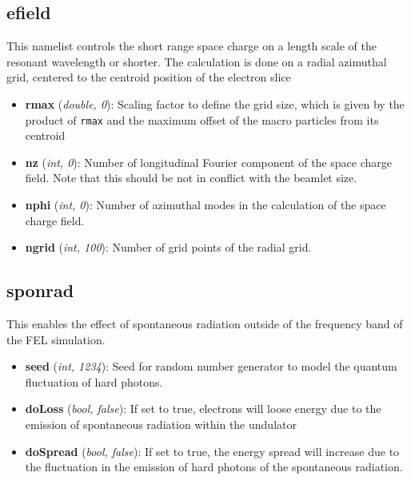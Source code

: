 \documentclass[12pt]{book}
\begin{document}
\subsection {\sf efield}
This namelist controls the short range space charge on a length scale of the resonant wavelength or shorter. The calculation is done on a radial azimuthal grid, centered to the centroid position of the electron slice
\begin{itemize}
\item {\bf rmax} ({\it double, 0}): Scaling factor to define the grid size, which is given by the product of {\tt rmax} and the maximum offset of the macro particles from its centroid
\item {\bf nz} ({\it int, 0}): Number of longitudinal Fourier component of the space charge field. Note that this should be not in conflict with the beamlet size.
\item {\bf nphi} ({\it int, 0}): Number of azimuthal modes in the calculation of the space charge field.
\item {\bf ngrid} ({\it int, 100}): Number of grid points of the radial grid.
\end{itemize}

\subsection{\sf sponrad}
This enables the effect of spontaneous radiation outside of the frequency band of the FEL simulation. 
\begin{itemize}
\item {\bf seed} ({\it int, 1234}): Seed for random number generator to model the quantum fluctuation of hard photons.
\item {\bf doLoss} ({\it bool, false}): If set to true, electrons will loose energy due to the emission of spontaneous radiation within the undulator
\item {\bf doSpread} ({\it bool, false}): If set to true, the energy spread will increase due to the fluctuation in the emission of hard photons of the spontaneous radiation.
\end{itemize}
\end{document}
